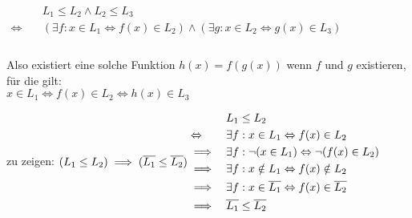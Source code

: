 $
\begin{aligned}
&L_1 \leq L_2 \wedge L_2 \leq L_3\\
\Leftrightarrow \quad &(\exists f: x \in L_1 \Leftrightarrow f(x) \in L_2) \wedge (\exists g: x \in L_2 \Leftrightarrow g(x) \in L_3)\\
\end{aligned}
$
\\ \ \\
Also existiert eine solche Funktion $h(x)=f(g(x))$ wenn $f$ und $g$ existieren, für die gilt:\\
$ x \in L_1 \Leftrightarrow f(x) \in L_2 \Leftrightarrow h(x) \in L_3$

zu zeigen: \quad$(L_1 \leq L_2) \implies (\overline{L_1} \leq \overline{L_2})\\ \ \\
\begin{aligned}
& &&L_1 \leq L_2\\
&\Leftrightarrow &&\exists f: x \in L_1 \Leftrightarrow f(x) \in L_2\\
&\implies &&\exists f: \neg (x \in L_1) \Leftrightarrow \neg (f(x) \in L_2)\\
&\implies && \exists f: x \notin L_1 \Leftrightarrow f(x) \notin L_2\\
&\implies && \exists f: x \in \overline{L_1} \Leftrightarrow f(x) \in \overline{L_2}\\
&\implies && \overline{L_1} \leq \overline{L_2}
\end{aligned}$
